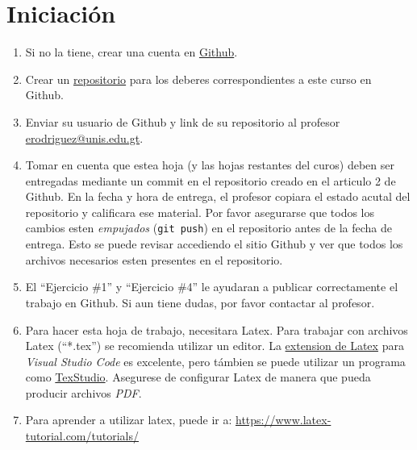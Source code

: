 \documentclass{article}
\begin{document}
\section*{Iniciaci\'on}
\begin{enumerate}
        \item{Si no la tiene, crear una cuenta en \href{https://github.com/}{Github}.}
        \item{Crear un \href{https://help.github.com/en/articles/create-a-repo}{repositorio} para los deberes correspondientes a este curso en Github.}
        \item{Enviar su usuario de Github y link de su repositorio al profesor
        \href{mailto:erodriguez@unis.edu.gt}{erodriguez@unis.edu.gt}.}
        \item{Tomar en cuenta que estea hoja
        (y las hojas restantes del curos) deben ser entregadas mediante un commit
        en el repositorio creado en el articulo 2 de Github. En la fecha y hora de entrega,
        el profesor copiara el estado acutal del repositorio y calificara ese material. Por
        favor asegurarse que todos los cambios esten \emph{empujados} (\texttt{git push}) en el
        repositorio antes de la fecha de entrega. Esto se puede revisar accediendo el sitio
        Github y ver que todos los archivos necesarios esten presentes en el repositorio.}
        \item{El ``Ejercicio \#1'' y ``Ejercicio \#4'' le ayudaran a publicar correctamente
        el trabajo en Github. Si aun tiene dudas, por favor contactar al profesor.}
        \item{Para hacer esta hoja de trabajo, necesitara Latex\cite{LatexPage}. Para trabajar
        con archivos Latex (``*.tex'') se recomienda utilizar un editor. La \href{https://marketplace.visualstudio.com/items?itemName=James-Yu.latex-workshop}{extension de
        Latex} para \emph{Visual Studio Code} es excelente, pero t\'ambien se puede utilizar
        un programa como \href{https://www.texstudio.org}{TexStudio}. Asegurese
        de configurar Latex de manera que pueda producir archivos \emph{PDF}.}
        \item{Para aprender a utilizar latex, puede ir a: \url{https://www.latex-tutorial.com/tutorials/}}
\end{enumerate}
\end{document}

